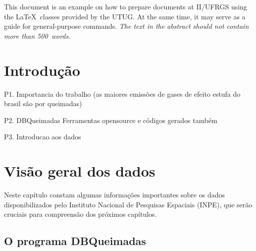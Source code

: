 \documentclass[cic,tc]{iiufrgs}
\begin{document}
\listoffigures

\listoftables

\begin{abstract}
Este documento é um exemplo de como formatar documentos para o
Instituto de Informática da UFRGS usando as classes \LaTeX\
disponibilizadas pelo UTUG\@. Ao mesmo tempo, pode servir de consulta
para comandos mais genéricos. \emph{O texto do resumo não deve
conter mais do que 500 palavras.}
\end{abstract}

\begin{translatedabstract}
This document is an example on how to prepare documents at II/UFRGS
using the \LaTeX\ classes provided by the UTUG\@. At the same time, it
may serve as a guide for general-purpose commands. \emph{The text in
the abstract should not contain more than 500~words.}
\end{translatedabstract}



\chapter{Introdução}
P1. Importancia do trabalho (as maiores emissões de gases de efeito estufa do brasil são por queimadas) \par
P2. DBQueimadas Ferramentas opensource e códigos gerados também \par
P3. Introducao aos dados \par


\chapter{Visão geral dos dados}

Neste capítulo constam algumas informações importantes sobre os 
dados disponibilizados pelo Instituto Nacional de Pesquisas Espaciais (INPE), 
que serão cruciais para compreensão dos próximos capítulos. 

\section{O programa DBQueimadas}
\end{document}
